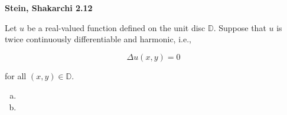 \textbf{Stein, Shakarchi 2.12}

Let $u$ be a real-valued function defined on the unit disc $\mathbb{D}$. Suppose that $u$ is twice continuously 
differentiable and harmonic, i.e.,

$$
\Delta u (x, y) = 0
$$

for all $(x, y) \in \mathbb{D}$.

\begin{enumerate}[(a)]
    \item 
    \pagebreak
    \item 
\end{enumerate}